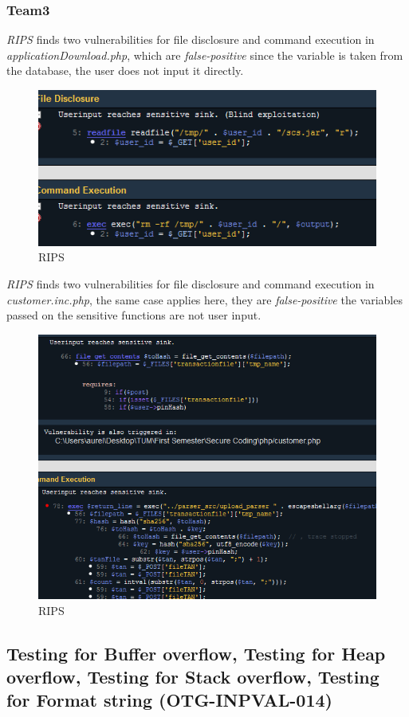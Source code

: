 \documentclass[headsepline,footsepline,footinclude=false,oneside,fontsize=11pt,paper=a4,listof=totoc,bibliography=totoc]{scrbook} %
\begin{document}
\subsubsection{Team3}
\textit{RIPS} finds two vulnerabilities for file disclosure and command execution in \textit{applicationDownload.php}, which are \textit{false-positive} since the variable is taken from the database, the user does not input it directly.
\begin{figure}[H]
	\centering
	\includegraphics[width=120mm]{logos/download3.jpg}
	\caption{RIPS \label{overflow}}
\end{figure}
\textit{RIPS} finds two vulnerabilities for file disclosure and command execution in \textit{customer.inc.php}, the same case applies here, they are \textit{false-positive} the variables passed on the sensitive functions are not user input.
\begin{figure}[H]
	\centering
	\includegraphics[width=120mm]{logos/trans3.jpg}
	\caption{RIPS \label{overflow}}
\end{figure}
\pagebreak
\subsection{Testing for Buffer overflow, Testing for Heap overflow, Testing for Stack overflow, Testing for Format string (OTG-INPVAL-014)}\
\end{document}
